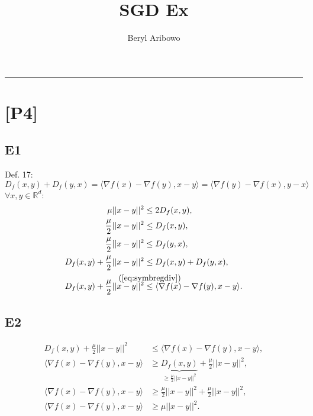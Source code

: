 \documentclass[12pt]{article}
\title{SGD Ex}
\author{Beryl Aribowo}
\newcommand{\defeq}[2]{\stackrel{\mathclap{\normalfont\mbox{#1}}}{#2}}
\def\att{                    %
        \marginpar[ \hspace*{\fill} \raisebox{-0.2em}{\rule{2mm}{1.2em}} ]
        {\raisebox{-0.2em}{\rule{2mm}{1.2em}} }
        }
\def\at#1{[*** \att #1 ***]}  %
\begin{document}
\maketitle

\hrule
\vspace{0.1cm}
\section*{[P4]}
\subsection*{E1}
Def. 17:
\begin{equation}
    D_f(x, y) + D_f(y, x) = \langle \nabla f(x) - \nabla f(y), x - y \rangle 
                            = \langle \nabla f(y) - \nabla f(x), y - x \rangle
    \label{eq:symbregdiv}
\end{equation}
$\forall x, y \in \mathbb{R}^d $:
\begin{equation}
    \begin{split}
        \mu ||x-y||^2 & \leq 2D_f(x,y), \\
        \frac{\mu}{2} ||x-y||^2 & \leq D_f(x, y), \\
        \frac{\mu}{2} ||x-y||^2 & \leq D_f(y, x), \\
        D_f(x, y) + \frac{\mu}{2} ||x-y||^2 & \leq D_f(x, y) + D_f(y, x), \\
        D_f(x, y) + \frac{\mu}{2} ||x-y||^2 & \defeq{(\refeq{eq:symbregdiv})}{\leq} \langle \nabla f(x) - \nabla f(y), x - y \rangle.
    \end{split}
    \label{eq:E1}
\end{equation}

\subsection*{E2}
\begin{equation}
    \begin{split}
        D_f(x, y) + \frac{\mu}{2} ||x-y||^2 & \leq \langle \nabla f(x) - \nabla f(y), x - y \rangle, \\
        \langle \nabla f(x) - \nabla f(y), x - y \rangle & \geq \underbrace{D_f(x, y)}_{\geq \frac{\mu}{2} ||x-y||^2} + \frac{\mu}{2} ||x-y||^2, \\
        \langle \nabla f(x) - \nabla f(y), x - y \rangle & \geq \frac{\mu}{2} ||x-y||^2 + \frac{\mu}{2} ||x-y||^2, \\
        \langle \nabla f(x) - \nabla f(y), x - y \rangle & \geq \mu ||x-y||^2.
    \end{split}
    \label{eq:E2}
\end{equation}
\vspace{0.1cm}
\end{document}
